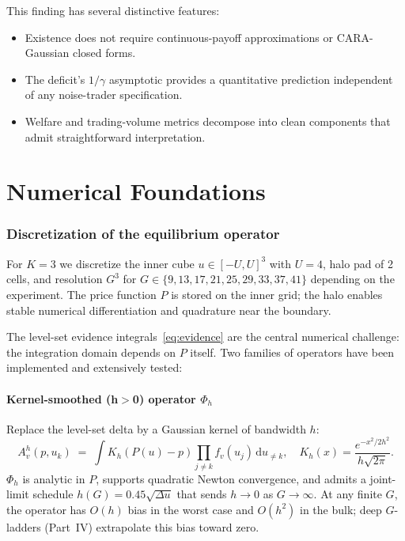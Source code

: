 \documentclass[11pt]{article}
\newcommand{\1}{\mathbf{1}}
\begin{document}
This finding has several distinctive features:
\begin{itemize}
\item Existence does not require continuous-payoff approximations or
CARA-Gaussian closed forms.
\item The deficit's $1/\gamma$ asymptotic provides a quantitative
prediction independent of any noise-trader specification.
\item Welfare and trading-volume metrics decompose into clean components
that admit straightforward interpretation.
\end{itemize}

\part{Numerical Foundations}

\section{Discretization of the equilibrium operator}

For $K=3$ we discretize the inner cube $u\in[-U,U]^3$ with $U=4$, halo
pad of 2 cells, and resolution $G^3$ for $G\in\{9, 13, 17, 21, 25, 29,
33, 37, 41\}$ depending on the experiment.  The price function $P$ is
stored on the inner grid; the halo enables stable numerical
differentiation and quadrature near the boundary.

The level-set evidence integrals~\eqref{eq:evidence} are the central
numerical challenge: the integration domain depends on $P$ itself.  Two
families of operators have been implemented and extensively tested:

\subsection{Kernel-smoothed (h$>$0) operator $\Phi_h$}

Replace the level-set delta by a Gaussian kernel of bandwidth $h$:
\begin{equation}
A_v^h(p, u_k) \;=\; \int K_h(P(u) - p) \prod_{j\ne k} f_v(u_j)\,\mathrm{d}u_{\ne k},
\quad K_h(x) = \frac{e^{-x^2/2h^2}}{h\sqrt{2\pi}}.
\end{equation}
$\Phi_h$ is analytic in $P$, supports quadratic Newton convergence, and
admits a joint-limit schedule $h(G) = 0.45\sqrt{\Delta u}$ that sends
$h\to 0$ as $G\to \infty$.  At any finite $G$, the operator has $O(h)$
bias in the worst case and $O(h^2)$ in the bulk; deep $G$-ladders
(Part~IV) extrapolate this bias toward zero.
\end{document}
